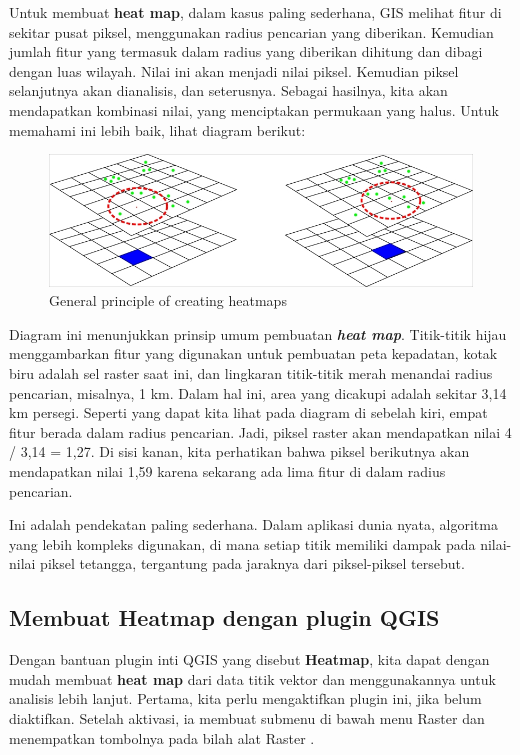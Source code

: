 \documentclass[]{book}
\begin{document}
Untuk membuat \textbf{heat map}, dalam kasus paling sederhana, GIS melihat fitur di sekitar pusat piksel, menggunakan radius pencarian yang diberikan. Kemudian jumlah fitur yang termasuk dalam radius yang diberikan dihitung dan dibagi dengan luas wilayah. Nilai ini akan menjadi nilai piksel. Kemudian piksel selanjutnya akan dianalisis, dan seterusnya. Sebagai hasilnya, kita akan mendapatkan kombinasi nilai, yang menciptakan permukaan yang halus. Untuk memahami ini lebih baik, lihat diagram berikut:

\begin{figure}

{\centering \includegraphics[width=0.7\linewidth]{images/04/fig0} 

}

\caption{General principle of creating heatmaps}\label{fig:fig1400}
\end{figure}

Diagram ini menunjukkan prinsip umum pembuatan \textbf{\emph{heat map}}. Titik-titik hijau menggambarkan fitur yang digunakan untuk pembuatan peta kepadatan, kotak biru adalah sel raster saat ini, dan lingkaran titik-titik merah menandai radius pencarian, misalnya, 1 km. Dalam hal ini, area yang dicakupi adalah sekitar 3,14 km persegi. Seperti yang dapat kita lihat pada diagram di sebelah kiri, empat fitur berada dalam radius pencarian. Jadi, piksel raster akan mendapatkan nilai 4 / 3,14 = 1,27. Di sisi kanan, kita perhatikan bahwa piksel berikutnya akan mendapatkan nilai 1,59 karena sekarang ada lima fitur di dalam radius pencarian.

Ini adalah pendekatan paling sederhana. Dalam aplikasi dunia nyata, algoritma yang lebih kompleks digunakan, di mana setiap titik memiliki dampak pada nilai-nilai piksel tetangga, tergantung pada jaraknya dari piksel-piksel tersebut.

\hypertarget{membuat-heatmap-dengan-plugin-qgis}{%
\subsection{Membuat Heatmap dengan plugin QGIS}\label{membuat-heatmap-dengan-plugin-qgis}}

Dengan bantuan plugin inti QGIS yang disebut \textbf{Heatmap}, kita dapat dengan mudah membuat \textbf{heat map} dari data titik vektor dan menggunakannya untuk analisis lebih lanjut. Pertama, kita perlu mengaktifkan plugin ini, jika belum diaktifkan. Setelah aktivasi, ia membuat submenu di bawah menu Raster dan menempatkan tombolnya pada bilah alat Raster .
\end{document}
